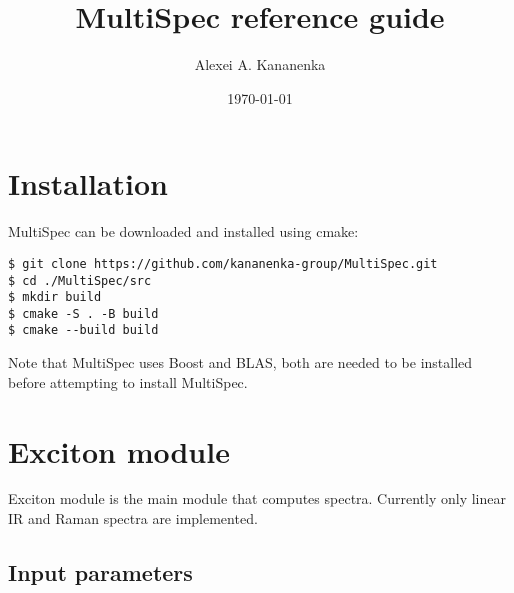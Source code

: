 \documentclass{article}
\begin{document}
\title{MultiSpec reference guide}
\author{Alexei A. Kananenka}
\date{\today}
\maketitle
\tableofcontents

\section{Installation}
MultiSpec can be downloaded and installed using cmake:
\begin{verbatim}
$ git clone https://github.com/kananenka-group/MultiSpec.git
$ cd ./MultiSpec/src
$ mkdir build 
$ cmake -S . -B build
$ cmake --build build
\end{verbatim}

Note that MultiSpec uses Boost and BLAS, both are needed to be installed before attempting to install MultiSpec.

\section{Exciton module}
Exciton module is the main module that computes spectra. Currently only linear IR and Raman spectra are implemented.

\subsection{Input parameters}
\end{document}
